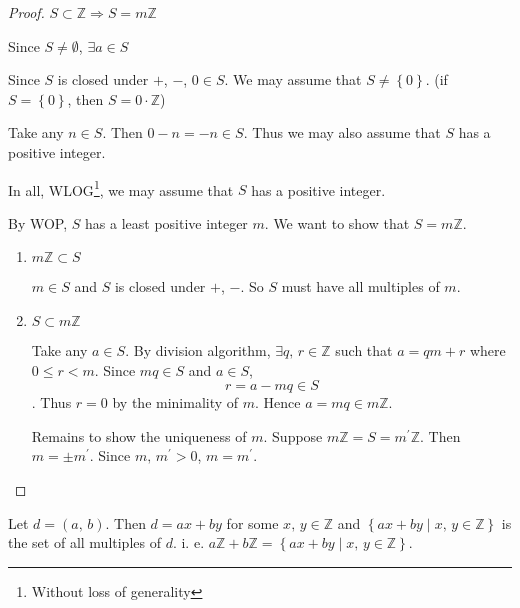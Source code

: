 
\begin{proof}
    $S \subset \mathbb{Z} \Rightarrow S = m\mathbb{Z}$

    Since $S \neq \emptyset$, $\exists a \in S$

    Since $S$ is closed under $+$, $-$, $0 \in S$. We may assume that
    $S \neq \left\{0\right\}$. (if $S = \left\{0\right\}$, then $S = 0\cdot \mathbb{Z}$)

    Take any $n \in S$. Then $0 - n = -n \in S$.
    Thus we may also assume that $S$ has a positive integer.

    In all, WLOG\footnote{Without loss of generality},
    we may assume that $S$ has a positive integer.

    By WOP, $S$ has a least positive integer $m$. We want to show that $S=m\mathbb{Z}$.


    \begin{enumerate}
        \item $m\mathbb{Z} \subset S$
        
        $m \in S$ and $S$ is closed under $+$, $-$. So $S$ must have all multiples of $m$.

        \item $S \subset m\mathbb{Z}$
        
        Take any $a \in S$. By division algorithm, $\exists q,\, r \in \mathbb{Z}$ such that
        $a = qm + r$ where $0 \leq r < m$.
        Since $mq \in S$ and $a \in S$, \[r = a - mq \in S\].
        Thus $r = 0$ by the minimality of $m$. Hence $a = mq \in m\mathbb{Z}$.

        Remains to show the uniqueness of $m$. Suppose $m\mathbb{Z} = S = m^\prime\mathbb{Z}$.
        Then $m = \pm m^\prime$.
        Since $m,\,m^\prime > 0$, $m=m^\prime$.
    \end{enumerate}
\end{proof}

\begin{theorem}
    Let $d=\left(a,\,b\right)$. Then $d=ax+by$ for some $x,\,y \in \mathbb{Z}$
    and $\left\{ax+by \mid x,\,y \in \mathbb{Z}\right\}$ is the set of all multiples of $d$.
    i. e. $a\mathbb{Z}+b\mathbb{Z} = \left\{ax+by \mid x,\,y \in \mathbb{Z}\right\}$.
\end{theorem}


